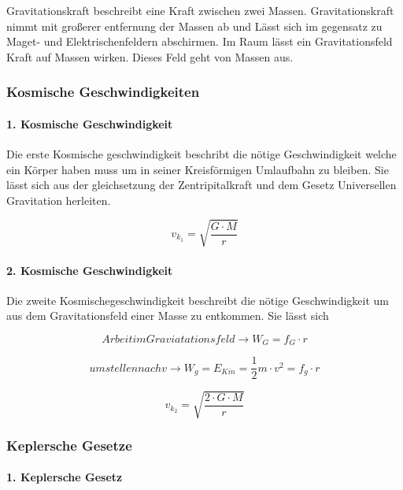\documentclass{article}
\begin{document}
        		Gravitationskraft beschreibt eine Kraft zwischen zwei Massen. Gravitationskraft nimmt mit großerer entfernung der Massen ab und Lässt sich im gegensatz zu Maget- und Elektrischenfeldern abschirmen. Im Raum lässt ein Gravitationsfeld Kraft auf Massen wirken. Dieses Feld geht von Massen aus.
        
         	\subsubsection{Kosmische Geschwindigkeiten}
         		
         		\paragraph{1. Kosmische Geschwindigkeit \newline}
         		
         			Die erste Kosmische geschwindigkeit beschribt die nötige Geschwindigkeit welche ein Körper haben muss um in seiner Kreisförmigen Umlaufbahn zu bleiben. Sie lässt sich aus der gleichsetzung der Zentripitalkraft und dem Gesetz Universellen Gravitation herleiten. 
         			
         			\[v_{k_{1}} = \sqrt{\frac{G \cdot M} {r}}\]
         			
         		\paragraph{2. Kosmische Geschwindigkeit \newline}
         		
         			Die zweite Kosmischegeschwindigkeit beschreibt die nötige Geschwindigkeit um aus dem Gravitationsfeld einer Masse zu entkommen. Sie lässt sich 
         			
         			\[Arbeit im Graviatationsfeld \longrightarrow W_{G} = f_{G} \cdot r\]
         			
         			\[ umstellen nach v  \longrightarrow W_{g} = E_{Kin} = \frac{1}{2} m \cdot v ^2 = f_{g} \cdot r\]
         			
         			\[v_{k_{2}} = \sqrt{\frac{2\cdot G \cdot M} {r}}\]
         			
        
            \subsubsection{Keplersche Gesetze}
            
            	\paragraph{1. Keplersche Gesetz \newline}
            		
\end{document}
